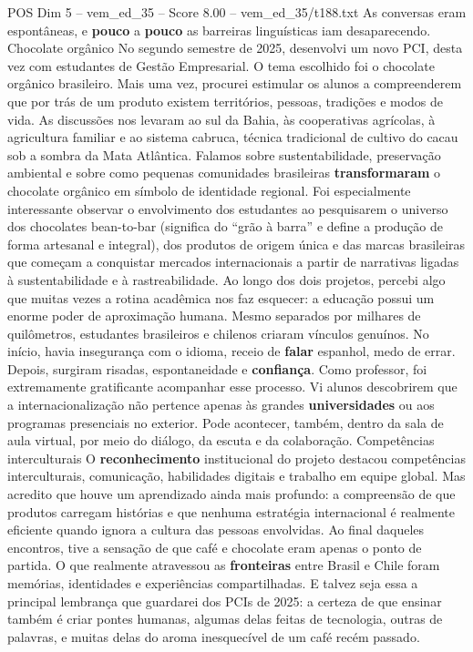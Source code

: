 \begin{textsample}{POS Dim 5 – vem\_ed\_35 – Score 8.00 – vem\_ed\_35/t188.txt}
As conversas eram espontâneas, e \textbf{pouco} a \textbf{pouco} as barreiras linguísticas iam desaparecendo.
Chocolate orgânico No segundo semestre de 2025, desenvolvi um novo PCI, desta vez com estudantes de Gestão Empresarial.
O tema escolhido foi o chocolate orgânico brasileiro.
Mais uma vez, procurei estimular os alunos a compreenderem que por trás de um produto existem territórios, pessoas, tradições e modos de vida.
As discussões nos levaram ao sul da Bahia, às cooperativas agrícolas, à agricultura familiar e ao sistema cabruca, técnica tradicional de cultivo do cacau sob a sombra da Mata Atlântica.
Falamos sobre sustentabilidade, preservação ambiental e sobre como pequenas comunidades brasileiras \textbf{transformaram} o chocolate orgânico em símbolo de identidade regional.
Foi especialmente interessante observar o envolvimento dos estudantes ao pesquisarem o universo dos chocolates bean-to-bar (significa do “grão à barra” e define a produção de forma artesanal e integral), dos produtos de origem única e das marcas brasileiras que começam a conquistar mercados internacionais a partir de narrativas ligadas à sustentabilidade e à rastreabilidade.
Ao longo dos dois projetos, percebi algo que muitas vezes a rotina acadêmica nos faz esquecer: a educação possui um enorme poder de aproximação humana.
Mesmo separados por milhares de quilômetros, estudantes brasileiros e chilenos criaram vínculos genuínos.
No início, havia insegurança com o idioma, receio de \textbf{falar} espanhol, medo de errar.
Depois, surgiram risadas, espontaneidade e \textbf{confiança}.
Como professor, foi extremamente gratificante acompanhar esse processo.
Vi alunos descobrirem que a internacionalização não pertence apenas às grandes \textbf{universidades} ou aos programas presenciais no exterior.
Pode acontecer, também, dentro da sala de aula virtual, por meio do diálogo, da escuta e da colaboração.
Competências interculturais O \textbf{reconhecimento} institucional do projeto destacou competências interculturais, comunicação, habilidades digitais e trabalho em equipe global.
Mas acredito que houve um aprendizado ainda mais profundo: a compreensão de que produtos carregam histórias e que nenhuma estratégia internacional é realmente eficiente quando ignora a cultura das pessoas envolvidas.
Ao final daqueles encontros, tive a sensação de que café e chocolate eram apenas o ponto de partida.
O que realmente atravessou as \textbf{fronteiras} entre Brasil e Chile foram memórias, identidades e experiências compartilhadas.
E talvez seja essa a principal lembrança que guardarei dos PCIs de 2025: a certeza de que ensinar também é criar pontes humanas, algumas delas feitas de tecnologia, outras de palavras, e muitas delas do aroma inesquecível de um café recém passado.

\end{textsample}
